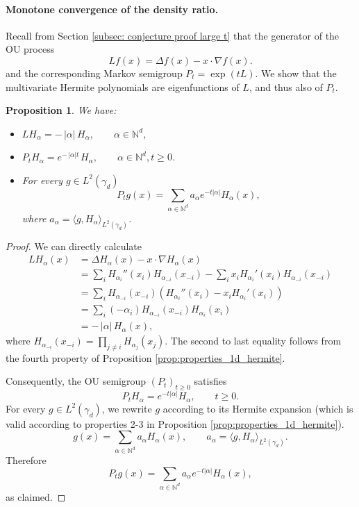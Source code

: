 \documentclass[12pt]{article}
\newcommand{\0}{\mathbf{0}}
\newtheorem{prop}{Proposition}
\begin{document}
\paragraph{Monotone convergence of the density ratio.}
Recall from Section \ref{subsec: conjecture proof large t} that the generator of the OU process
\[
Lf(x) = \Delta f(x) - x\cdot\nabla f(x).
\]
and the corresponding Markov semigroup $P_t = \exp(tL)$. We show that the multivariate Hermite polynomials are eigenfunctions of $L$, and thus also of $P_t$.
\begin{prop}\label{prop: eigenfunction of generator}
    We have:
    \begin{itemize}
        \item $L H_\alpha = -\,|\alpha|\, H_\alpha,\qquad \alpha\in\mathbb N^d$,
        \item $P_t H_\alpha = e^{-\,|\alpha|t\,} H_\alpha,\qquad \alpha\in\mathbb N^d, t \geq 0$.
        \item For every $g \in L^2(\gamma_d)$
        \[
        P_t g(x)=\sum_{\alpha\in\mathbb N^d} a_\alpha e^{-t|\alpha|} H_\alpha(x),
        \]
        where $a_\alpha=\langle g,H_\alpha\rangle_{L^2(\gamma_d)}$.
    \end{itemize}
\end{prop}
\begin{proof}
    We can directly calculate
\begin{align*}
    L H_\alpha(x) &= \Delta H_\alpha(x) - x \cdot \nabla H_\alpha(x) \\
               & = \sum_{i} H_{\alpha_i}''(x_i) H_{\alpha_{-i}}(x_{-i}) - \sum_{i} x_i H_{\alpha_i}'(x_i) H_{\alpha_{-i}}(x_{-i})\\
               & = \sum_i H_{\alpha_{-i}}(x_{-i})(H_{\alpha_i}''(x_i) - x_i H_{\alpha_i}'(x_i))\\
               & = \sum_i (-\alpha_i)H_{\alpha_{-i}}(x_{-i}) H_{\alpha_i}(x_i) \\
               & = -\,|\alpha|\, H_\alpha(x),
\end{align*}
where $H_{\alpha_{-i}}(x_{-i}) = \prod_{j\neq i}H_{\alpha_{j}}(x_{j})$. The second to last equality follows from the fourth property of Proposition \ref{prop:properties_1d_hermite}.


Consequently, the OU semigroup $(P_t)_{t\ge0}$ satisfies
\[
P_t H_\alpha = e^{-t|\alpha|} H_\alpha,\qquad t\ge0.
\]
For every $g\in L^2(\gamma_d)$, we rewrite $g$ according to its Hermite expansion (which is valid according to properties 2-3 in Proposition \ref{prop:properties_1d_hermite}).
\[
g(x)=\sum_{\alpha\in\mathbb N^d} a_\alpha H_\alpha(x),
\qquad a_\alpha=\langle g,H_\alpha\rangle_{L^2(\gamma_d)}.
\]
Therefore
\[
P_t g(x)=\sum_{\alpha\in\mathbb N^d} a_\alpha e^{-t|\alpha|} H_\alpha(x),
\]
as claimed.
\end{proof}
\end{document}
